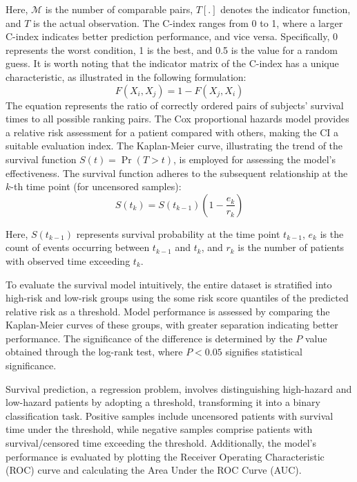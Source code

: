 \documentclass[journal,twoside,web]{ieeecolor}
\begin{document}
Here, $\mathcal{M}$ is the number of comparable pairs, $T[.]$ denotes the indicator function, and $T$ is the actual observation. 
The C-index ranges from 0 to 1, where a larger C-index indicates better prediction performance, and vice versa. Specifically, 0 represents the worst condition, 1 is the best, and 0.5 is the value for a random guess. 
It is worth noting that the indicator matrix of the C-index has a unique characteristic, as illustrated in the following formulation:
\begin{equation}\label{c-index-2}
    F(X_i, X_j) = 1 - F(X_j, X_i)
\end{equation}
The equation represents the ratio of correctly ordered pairs of subjects' survival times to all possible ranking pairs. 
The Cox proportional hazards model provides a relative risk assessment for a patient compared with others, making the CI a suitable evaluation index.
The Kaplan-Meier curve, illustrating the trend of the survival function $S(t)=\Pr(T>t)$, is employed for assessing the model's effectiveness. 
The survival function adheres to the subsequent relationship at the $k$-th time point (for uncensored samples):
\begin{equation}
S(t_k)=S(t_{k-1})(1-\frac{e_k}{r_k})
\end{equation}

Here, $S(t_{k-1})$ represents survival probability at the time point $t_{k-1}$, $e_k$ is the count of events occurring between $t_{k-1}$ and $t_k$, and $r_k$ is the number of patients with observed time exceeding $t_k$.

To evaluate the survival model intuitively, the entire dataset is stratified into high-risk and low-risk groups using the some risk score quantiles of the predicted relative risk as a threshold. Model performance is assessed by comparing the Kaplan-Meier curves of these groups, with greater separation indicating better performance. The significance of the difference is determined by the $P$ value obtained through the log-rank test, where $P<0.05$ signifies statistical significance.

Survival prediction, a regression problem, involves distinguishing high-hazard and low-hazard patients by adopting a threshold, transforming it into a binary classification task. 
Positive samples include uncensored patients with survival time under the threshold, while negative samples comprise patients with survival/censored time exceeding the threshold. Additionally, the model's performance is evaluated by plotting the Receiver Operating Characteristic (ROC) curve and calculating the Area Under the ROC Curve (AUC).
\end{document}
